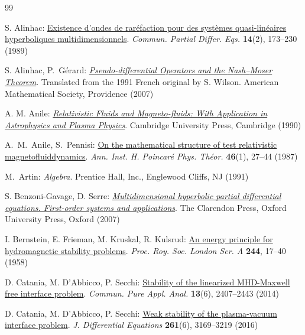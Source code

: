 \documentclass[twoside,11pt]{article}
\numberwithin{equation}{section}
\begin{document}
	
	{\footnotesize %
		\begin{thebibliography}{99}\setlength{\itemsep}{0.3mm}
			
			 S. Alinhac: \href{https://doi.org/10.1080/03605308908820595}{Existence d'ondes de rar{\'e}faction pour des syst{\`e}mes quasi-lin{\'e}aires hyperboliques multidimensionnels}. {\it Commun. Partial Differ. Eqs.} {\bf 14}(2), 173--230 (1989)
	
	 S. Alinhac, P.~G{{\'e}}rard:  \href{https://doi.org/10.1090/gsm/082}{{\it Pseudo-differential Operators and the {N}ash--{M}oser Theorem}}. Translated from the 1991 French original by S. Wilson. American Mathematical Society, Providence (2007)		
			
			 A. M. Anile: \href{http://dx.doi.org/10.1017/CBO9780511564130}{\it Relativistic Fluids and Magneto-fluids: With Application in Astrophysics and Plasma Physics}. Cambridge University Press, Cambridge (1990)

 A.~M.~Anile, S.~Pennisi: \href{https://www.numdam.org/item/AIHPA_1987__46_1_27_0/}{On the mathematical structure of test relativistic magnetofluiddynamics}. {\it Ann. Inst. H. Poincar\'{e} Phys. Th\'{e}or.} {\bf 46}(1), 27--44 (1987)

 M.~Artin: {\it Algebra}. Prentice Hall, Inc., Englewood Cliffs, NJ (1991)

			 S. Benzoni-Gavage, D. Serre: \href{https://doi.org/10.1093/acprof:oso/9780199211234.001.0001}{\it Multidimensional hyperbolic partial differential equations. First-order systems and applications}. The Clarendon Press, Oxford University Press, Oxford (2007)
			
			 I. Bernstein, E. Frieman, M. Kruskal, R. Kulsrud: \href{https://doi.org/10.1098/rspa.1958.0023}{An energy principle for hydromagnetic stability problems}. {\it Proc. Roy. Soc. London Ser. A} {\bf 244}, 17--40 (1958)
			

			
			 D. Catania, M. D'Abbicco, P. Secchi: \href{https://doi.org/10.3934/cpaa.2014.13.2407}{Stability of the linearized MHD-Maxwell free interface problem}. {\it Commun. Pure Appl. Anal.} {\bf 13}(6), 2407--2443 (2014)
			
			 D. Catania, M. D'Abbicco, P. Secchi: \href{https://doi.org/10.1016/j.jde.2016.05.023}{Weak stability of the plasma-vacuum interface problem}. {\it J. Differential Equations} {\bf 261}(6), 3169--3219 (2016)
			

\end{thebibliography}}
\end{document}
